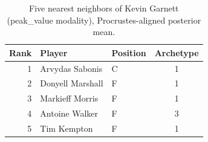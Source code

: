 \begin{table}[htbp]
  \centering\small
  \begin{tabular}{rllc}
    \toprule
    Rank & Player & Position & Archetype \\
    \midrule
    1 & Arvydas Sabonis & C & 1 \\
    2 & Donyell Marshall & F & 1 \\
    3 & Markieff Morris & F & 1 \\
    4 & Antoine Walker & F & 3 \\
    5 & Tim Kempton & F & 1 \\
    \bottomrule
  \end{tabular}
  \caption{Five nearest neighbors of Kevin Garnett (peak_value modality), Procrustes-aligned posterior mean.}
  \label{tab:Kevin_Garnett_neighbors_peak_value}
\end{table}

